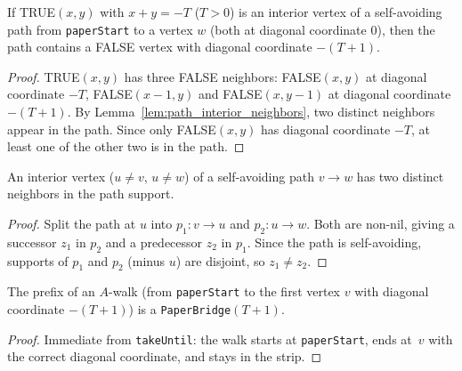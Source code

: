 \begin{lemma}\label{lem:true_boundary_lower}
\leanok
{}
  If TRUE$(x,y)$ with $x{+}y = -T$ ($T > 0$) is an interior vertex of a
  self-avoiding path from \texttt{paperStart} to a vertex $w$ (both at
  diagonal coordinate 0), then the path contains a FALSE vertex with
  diagonal coordinate $-(T{+}1)$.
\end{lemma}
\begin{proof}
\leanok
{}
  TRUE$(x,y)$ has three FALSE neighbors: FALSE$(x,y)$ at diagonal coordinate $-T$,
  FALSE$(x{-}1,y)$ and FALSE$(x,y{-}1)$ at diagonal coordinate $-(T{+}1)$.
  By Lemma~\ref{lem:path_interior_neighbors}, two distinct neighbors appear
  in the path. Since only FALSE$(x,y)$ has diagonal coordinate $-T$, at least one
  of the other two is in the path.
\end{proof}

\begin{lemma}\label{lem:path_interior_neighbors}
\leanok
{}
  An interior vertex ($u \neq v$, $u \neq w$) of a self-avoiding path $v \to w$
  has two distinct neighbors in the path support.
\end{lemma}
\begin{proof}
\leanok
{}
  Split the path at $u$ into $p_1: v \to u$ and $p_2: u \to w$.
  Both are non-nil, giving a successor $z_1$ in $p_2$ and a predecessor $z_2$
  in $p_1$. Since the path is self-avoiding, supports of $p_1$ and $p_2$
  (minus $u$) are disjoint, so $z_1 \neq z_2$.
\end{proof}

\begin{lemma}\label{lem:prefix_bridge}
\leanok
{}
  The prefix of an $A$-walk (from \texttt{paperStart} to the first vertex $v$
  with diagonal coordinate $-(T{+}1)$) is a \texttt{PaperBridge}$(T{+}1)$.
\end{lemma}
\begin{proof}
\leanok
{}
  Immediate from \texttt{takeUntil}: the walk starts at \texttt{paperStart},
  ends at~$v$ with the correct diagonal coordinate, and stays in the strip.
\end{proof}

